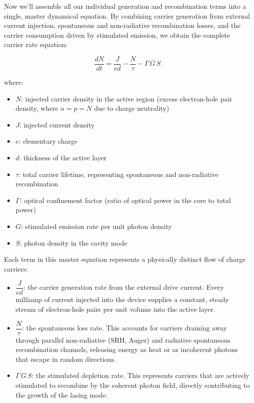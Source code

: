 Now we'll assemble all our individual generation and recombination terms into a single, master dynamical equation. By combining carrier generation from external current injection, spontaneous and non-radiative recombination losses, and the carrier consumption driven by stimulated emission, we obtain the complete carrier rate equation:
\begin{keyresult}
    \begin{equation}
        \frac{dN}{dt} = \frac{J}{ed} - \frac{N}{\tau} - \Gamma\,G\,S
    \end{equation}
\end{keyresult}
where:
\begin{itemize}
    \item $N$: injected carrier density in the active region (excess electron-hole pair density, where $n = p = N$ due to charge neutrality)
    \item $J$: injected current density
    \item $e$: elementary charge
    \item $d$: thickness of the active layer
    \item $\tau$: total carrier lifetime, representing spontaneous and non-radiative recombination
    \item $\Gamma$: optical confinement factor (ratio of optical power in the core to total power)
    \item $G$: stimulated emission rate per unit photon density
    \item $S$: photon density in the cavity mode
\end{itemize}

Each term in this master equation represents a physically distinct flow of charge carriers:
\begin{itemize}
    \item $\dfrac{J}{ed}$: the carrier generation rate from the external drive current. Every milliamp of current injected into the device supplies a constant, steady stream of electron-hole pairs per unit volume into the active layer.
    \item $\dfrac{N}{\tau}$: the spontaneous loss rate. This accounts for carriers draining away through parallel non-radiative (SRH, Auger) and radiative spontaneous recombination channels, releasing energy as heat or as incoherent photons that escape in random directions.
    \item $\Gamma\,G\,S$: the stimulated depletion rate. This represents carriers that are actively stimulated to recombine by the coherent photon field, directly contributing to the growth of the lasing mode. 
\end{itemize}

